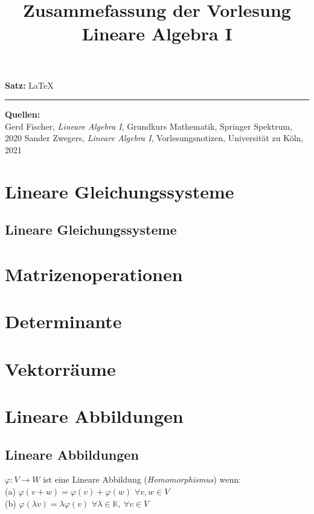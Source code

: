 \documentclass[12pt, a4paper]{report}
\title{\LARGE   Zusammefassung der Vorlesung  \vspace*{0.5cm} \\
  \Huge Lineare Algebra I}
\theoremstyle{definition}
\begin{document}
\maketitle
\newpage
\vspace*{\fill}
\begin{normalsize}
\noindent
  \textbf{Satz:}
  \LaTeX
\end{normalsize}
\vspace*{5pt}
\hrule
\vspace{5pt}
\noindent
\textbf{Quellen:}
\\
Gerd Fischer, \textit{Lineare Algebra I}, Grundkurs Mathematik, Springer Spektrum, 2020
Sander Zwegers, \textit{Lineare Algebra I}, Vorlesungsnotizen, Universität zu Köln, 2021
\tableofcontents
\newpage
\chapter{Lineare Gleichungssysteme}
\section{Lineare Gleichungssysteme}


\chapter{Matrizenoperationen}

\chapter{Determinante}

\chapter{Vektorräume}

\chapter{Lineare Abbildungen}
\section{Lineare Abbildungen}

\begin{defi}
  $\varphi:V\longrightarrow W$ ist eine Lineare Abbildung (\textit{Homomorphismus}) wenn:\vspace*{0.3cm} \\
    \indent (a) $ \varphi(v + w) = \varphi(v) + \varphi(w) $ \indent $\forall v, w \in V$ \vspace*{0.2cm} \\
    \indent (b) $ \varphi(\lambda v) = \lambda \varphi(v) $ \indent $ \forall \lambda \in \mathbb{K}, \ 
    \forall v \in V$
\end{defi} 
\end{document}
